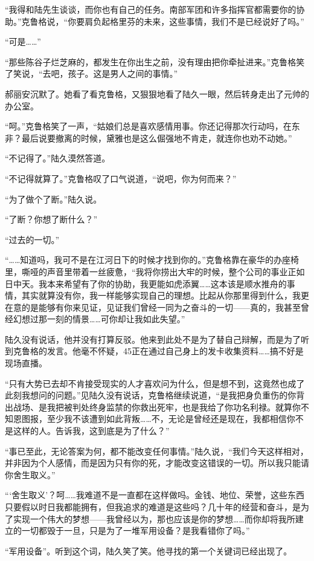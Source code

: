 “我得和陆先生谈谈，而你也有自己的任务。南部军团和许多指挥官都需要你的协助。”克鲁格说，“你要肩负起格里芬的未来，这些事情，我们不是已经说好了吗。”

“可是……”

“那些陈谷子烂芝麻的，都发生在你出生之前，没有理由把你牵扯进来。”克鲁格笑了笑说，“去吧，孩子。这是男人之间的事情。”

郝丽安沉默了。她看了看克鲁格，又狠狠地看了陆久一眼，然后转身走出了元帅的办公室。

“呵。”克鲁格笑了一声，“姑娘们总是喜欢感情用事。你还记得那次行动吗，在东非？最后说要撤离的时候，黛雅也是这么倔强地不肯走，就连你也劝不动她。”

“不记得了。”陆久漠然答道。

“不记得就算了。”克鲁格叹了口气说道，“说吧，你为何而来？”

“为了做个了断。”陆久说。

“了断？你想了断什么？”

“过去的一切。”

“……知道吗，我可不是在江河日下的时候才找到你的。”克鲁格靠在豪华的办座椅里，嘶哑的声音里带着一丝疲惫，“我将你捞出大牢的时候，整个公司的事业正如日中天。我本来希望有了你的协助，我更能如虎添翼……这本该是顺水推舟的事情，其实就算没有你，我一样能够实现自己的理想。比起从你那里得到什么，我更在意的是能够有你来见证，见证我们曾经一同为之奋斗的一切——真的，我甚至曾经幻想过那一刻的情景……可你却让我如此失望。”

陆久没有说话，他并没有打算反驳。他来到此处不是为了替自己辩解，而是为了听到克鲁格的发言。他毫不怀疑，45正在通过自己身上的发卡收集资料……搞不好是现场直播。

“只有大势已去却不肯接受现实的人才喜欢问为什么，但是想不到，这竟然也成了此刻我想问的问题。”见陆久没有说话，克鲁格继续说道，“是我把身负重伤的你背出战场、是我把被判处终身监禁的你救出死牢，也是我给了你功名利禄。就算你不知恩图报，至少我不该遭到如此背叛……不，无论是曾经还是现在，我都相信你不是这样的人。告诉我，这到底是为了什么？”

“事已至此，无论答案为何，都不能改变任何事情。”陆久说，“我们今天这样相对，并非因为个人感情，而是因为只有你的死，才能改变这错误的一切。所以我只能请你舍生取义。”

“‘舍生取义’？呵……我难道不是一直都在这样做吗。金钱、地位、荣誉，这些东西只要假以时日我都能拥有，但我追求的难道是这些吗？几十年的经营和奋斗，是为了实现一个伟大的梦想——我曾经以为，那也应该是你的梦想……而你却将我所建立的一切都毁于一旦，只是为了一堆军用设备？是我看错你了吗。”

“军用设备”。听到这个词，陆久笑了笑。他寻找的第一个关键词已经出现了。

